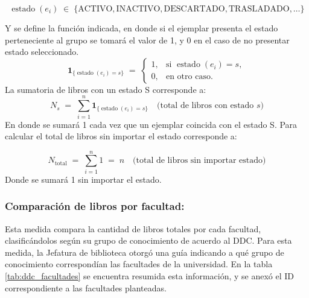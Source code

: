 \documentclass[spanish]{ieee_upb}
\begin{document}
\[
  \operatorname{estado}(e_i)\;\in\;
  \{\text{ACTIVO},\text{INACTIVO},\text{DESCARTADO},\text{TRASLADADO},\dots\}
\]

Y se define la función indicada, en donde si el ejemplar presenta el estado perteneciente al grupo se tomará el valor de 1, y 0 en el caso de no presentar estado seleccionado. 
\[
  \mathbf 1_{\{\operatorname{estado}(e_i)=s\}}
  \;=\;
  \begin{cases}
    1, & \text{si } \operatorname{estado}(e_i)=s,\\[4pt]
    0, & \text{en otro caso.}
  \end{cases}
\]
La sumatoria de libros con un estado S corresponde a:
\[
  N_s
  \;=\;
  \sum_{i=1}^{n}
    \mathbf 1_{\{\operatorname{estado}(e_i)=s\}}
  \quad
  \bigl(\text{total de libros con estado } s\bigr)
\]
En donde se sumará 1 cada vez que un ejemplar coincida con el estado S. Para calcular el total de libros sin importar el estado corresponde a:

\[
  N_{\text{total}}
  \;=\;
  \sum_{i=1}^{n} 1
  \;=\; n
  \quad
  \bigl(\text{total de libros sin importar estado}\bigr)
\]
Donde se sumará 1 sin importar el estado. 


\subsubsection{Comparación de libros por facultad:}
Esta medida compara la cantidad de libros totales por cada facultad, clasificándolos según su grupo de conocimiento de acuerdo al DDC. Para esta medida, la Jefatura de biblioteca otorgó una guía indicando a qué grupo de conocimiento correspondían las facultades de la universidad. En la tabla \ref{tab:ddc_facultades} se encuentra resumida esta información, y se anexó el ID correspondiente a las facultades planteadas. 
\end{document}
